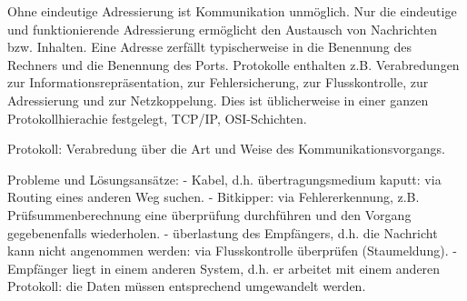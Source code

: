 \begin{answer}
Ohne eindeutige Adressierung ist Kommunikation unmöglich. Nur die eindeutige und funktionierende
Adressierung ermöglicht den Austausch von Nachrichten bzw. Inhalten.
Eine Adresse zerfällt typischerweise in die Benennung des Rechners und die Benennung des Ports.
Protokolle enthalten z.B. Verabredungen zur Informationsrepräsentation, zur Fehlersicherung, zur
Flusskontrolle, zur Adressierung und zur Netzkoppelung. Dies ist üblicherweise in einer ganzen
Protokollhierachie festgelegt, TCP/IP, OSI-Schichten.
\end{answer}

\begin{answer}
Protokoll: Verabredung über die Art und Weise des Kommunikationsvorgangs.
\end{answer}

\begin{answer}
Probleme und Lösungsansätze:
- Kabel, d.h. übertragungsmedium kaputt: via Routing eines anderen Weg suchen.
- Bitkipper: via Fehlererkennung, z.B. Prüfsummenberechnung eine überprüfung durchführen und
den Vorgang gegebenenfalls wiederholen.
- überlastung des Empfängers, d.h. die Nachricht kann nicht angenommen werden: via Flusskontrolle
überprüfen (Staumeldung).
- Empfänger liegt in einem anderen System, d.h. er arbeitet mit einem anderen Protokoll: die
Daten müssen entsprechend umgewandelt werden.
\end{answer}

